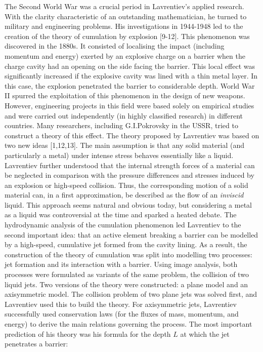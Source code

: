 \documentclass[%
 reprint,
onecolumn,
 amsmath,amssymb, aps,
]{revtex4-2}
\numberwithin{equation}{section}
\begin{document}
The Second World War was a crucial period in Lavrentiev's applied research.
With the clarity characteristic of an outstanding mathematician, he turned to military and engineering problems.
His investigations in 1944-1948 led to the creation of the theory of cumulation by explosion [9-12].
This phenomenon was discovered in the 1880s.
It consisted of localising the impact (including momentum and energy) exerted by an explosive charge on a barrier when the charge cavity had an opening on the side facing the barrier.
This local effect was significantly increased if the explosive cavity was lined with a thin metal layer.
In this case, the explosion penetrated the barrier to considerable depth.
World War II spurred the exploitation of this phenomenon in the design of new weapons.
However, engineering projects in this field were based solely on empirical studies and were carried out independently (in highly classified research) in different countries.
Many researchers, including G.I.Pokrovsky in the USSR, tried to construct a theory of this effect.
The theory proposed by Lavrentiev was based on two new ideas [1,12,13].
The main assumption is that any solid material (and particularly a metal) under intense stress behaves essentially like a liquid.
Lavrentiev further understood that the internal strength forces of a material can be neglected in comparison with the pressure differences and stresses induced by an explosion or high-speed collision.
Thus, the corresponding motion of a solid material can, in a first approximation, be described as the flow of an \emph {inviscid} liquid.
This approach seems natural and obvious today, but considering a metal as a liquid was controversial at the time and sparked a heated debate.
The hydrodynamic analysis of the cumulation phenomenon led Lavrentiev to the second important idea:
that an active element breaking a barrier can be modelled by a high-speed, cumulative jet formed from the cavity lining.
As a result, the construction of the theory of cumulation was split into modelling two processes: jet formation and its interaction with a barrier.
Using image analysis, both processes were formulated as variants of the same problem, the collision of two liquid jets.
Two versions of the theory were constructed: a plane model and an axisymmetric model.
The collision problem of two plane jets was solved first, and Lavrentiev used this to build the theory.
For axisymmetric jets, Lavrentiev successfully used conservation laws (for the fluxes of mass, momentum, and energy) to derive the main relations governing the process.
The most important prediction of his theory was his formula for the depth $L$ at which the jet penetrates a barrier:
\end{document}
